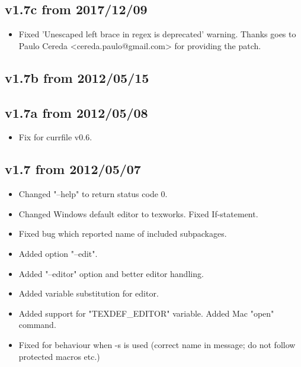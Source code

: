 \documentclass{article}
\begin{document}
\subsection*{v1.7c from 2017/12/09}
\begin{itemize}
 \item Fixed 'Unescaped left brace in regex is deprecated' warning.
   Thanks goes to Paulo Cereda <cereda.paulo@gmail.com> for providing the patch.
\end{itemize}

\subsection*{v1.7b from 2012/05/15}

\subsection*{v1.7a from 2012/05/08}
\begin{itemize}
 \item Fix for currfile v0.6.
\end{itemize}

\subsection*{v1.7 from 2012/05/07}
\begin{itemize}
 \item Changed "--help" to return status code 0.
 \item Changed Windows default editor to texworks. Fixed If-statement.
 \item Fixed bug which reported name of included subpackages.
 \item Added option "--edit".
 \item Added "--editor" option and better editor handling.
 \item Added variable substitution for editor.
 \item Added support for "TEXDEF\_EDITOR" variable. Added Mac "open" command.
 \item Fixed for behaviour when -s is used (correct name in message; do not follow protected macros etc.)
\end{itemize}
\end{document}
